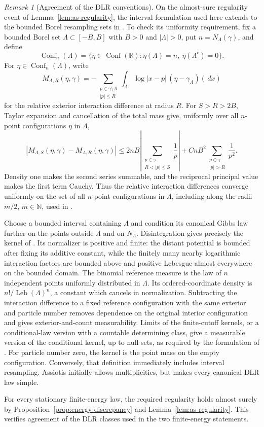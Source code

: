 \documentclass[11pt,reqno]{amsart}
\numberwithin{equation}{section}
\theoremstyle{definition}
\theoremstyle{remark}
\newtheorem{remark}[theorem]{Remark}
\newcommand{\R}{\mathbb R}
\newcommand{\N}{\mathbb N}
\newcommand{\1}{\mathbf 1}
\newcommand{\Conf}{\operatorname{Conf}}
\newcommand{\Leb}{\operatorname{Leb}}
\newcommand{\dd}{\,d}
\begin{document}
\begin{remark}[Agreement of the DLR conventions]\label{rem:dlr-conventions}
On the almost-sure regularity event of Lemma~\ref{lem:as-regularity},
the interval formulation used here extends to the bounded Borel
resampling sets in \cite[Definitions~2.1--2.2]{Assiotis}.
To check its uniformity requirement, fix a bounded Borel set
$\Lambda\subset[-B,B]$ with $B>0$ and $|\Lambda|>0$, put
$n=N_\Lambda(\gamma)$, and define
\[
\Conf_n(\Lambda)=\{\eta\in\Conf(\R):
                 \eta(\Lambda)=n,\ \eta(\Lambda^c)=0\}.
\]
For $\eta\in\Conf_n(\Lambda)$, write
\[
M_{\Lambda,R}(\eta,\gamma)
=-\sum_{\substack{p\in\gamma\setminus\Lambda\\|p|\le R}}
\int_\Lambda\log|x-p|\,(\eta-\gamma_\Lambda)(\dd x)
\]
for the relative exterior interaction difference at radius $R$.
For $S>R>2B$, Taylor expansion and cancellation of the total mass give,
uniformly over all $n$-point configurations $\eta$ in $\Lambda$,
\[
|M_{\Lambda,S}(\eta,\gamma)-M_{\Lambda,R}(\eta,\gamma)|
\le 2nB\left|\sum_{\substack{p\in\gamma\\R<|p|\le S}}\frac1p\right|
+CnB^2\sum_{\substack{p\in\gamma\\|p|>R}}\frac1{p^2}.
\]
Density one makes the second series summable, and the reciprocal
principal value makes the first term Cauchy. Thus the relative interaction differences converge
uniformly on the set of all $n$-point configurations in $\Lambda$, including along the radii $m/2$, $m\in\N$, used
in \cite{Assiotis}.

Choose a bounded interval containing $\Lambda$ and condition its
canonical Gibbs law further on the points outside $\Lambda$ and on
$N_\Lambda$. Disintegration gives precisely the kernel of
\cite[Definition~2.1]{Assiotis}. Its normalizer is positive and finite:
the distant potential is bounded after fixing its additive constant,
while the finitely many nearby logarithmic interaction factors are
bounded above and positive Lebesgue-almost everywhere on the bounded
domain. The binomial reference measure is the law of $n$ independent points
uniformly distributed in $\Lambda$. Its ordered-coordinate density is
$n!/\Leb(\Lambda)^n$, a constant which cancels in normalization. Subtracting the interaction difference to a
fixed reference configuration with the same exterior and particle number removes dependence on the
original interior configuration and gives exterior-and-count
measurability. Limits of the finite-cutoff kernels, or a conditional-law
version with a countable determining class, give a measurable version of the conditional kernel, up to null sets,
as required by the formulation of \cite[Definition~2.2]{Assiotis}. For particle number zero, the kernel is the point mass on the empty
configuration. Conversely, that definition immediately includes
interval resampling. Assiotis initially allows multiplicities, but
\cite[Lemma~2.8]{Assiotis} makes every canonical DLR law simple.

For every stationary finite-energy law, the required regularity holds
almost surely by Proposition~\ref{prop:energy-discrepancy} and
Lemma~\ref{lem:as-regularity}.
This verifies agreement of the DLR classes used in the two
finite-energy statements.
\end{remark}
\end{document}
